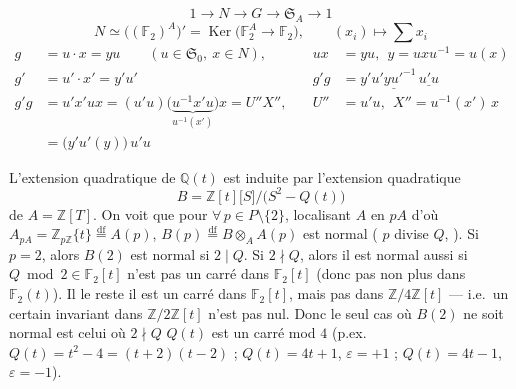 \documentclass[11pt,a4paper]{article}
\begin{document}
\[
1 \longrightarrow N \longrightarrow G \longrightarrow \mathfrak{S}_A \longrightarrow 1
\]
\[
N \simeq \bigl((\mathbb{F}_2)^A\bigr)' = \operatorname{Ker}\bigl(\mathbb{F}_2^A \to \mathbb{F}_2\bigr),
\qquad (x_i) \longmapsto \textstyle\sum x_i
\]
\[
\begin{aligned}
g &= u \cdot x = y u \qquad (u \in \mathfrak{S}_0,\ x \in N), &\quad
ux &= yu,\ \ y = u x u^{-1} = u(x) \\
g' &= u' \cdot x' = y' u' &\quad g'g &= y' \underline{u' y u'^{-1}}\, \underline{u' u} \\
g' g &= u' x' u x = (u' u)\bigl(\underbrace{u^{-1} x' u}_{u^{-1}(x')}\bigr) x = U'' X'' ,
&\quad U'' &= u'u,\ \ X'' = u^{-1}(x')\, x \\
&= \bigl(y' u'(y)\bigr)\, u' u
\end{aligned}
\]


L'extension quadratique de $\mathbb{Q}(t)$ est induite par l'extension
quadratique
\[
B = \mathbb{Z}[t]\bigl[S\bigr]/\bigl(S^2 - Q(t)\bigr)
\]
de $A = \mathbb{Z}[T]$. On voit que pour $\forall\, p \in P \setminus \{2\}$,
localisant $A$ en $pA$ d'où $A_{pA} = \mathbb{Z}_{p\mathbb{Z}}\{t\} \overset{\mathrm{df}}{=} A(p)$,
\struck{\ill{}} $B(p) \overset{\mathrm{df}}{=} B \otimes_A A(p)$ est normal (
$p$ divise $Q$, \ill{}). Si $p = 2$, alors $B(2)$ est normal si $2 \mid Q$. Si
$2 \nmid Q$, alors il est normal aussi si $Q \bmod 2 \in \mathbb{F}_2[t]$ n'est
pas un carré dans $\mathbb{F}_2[t]$ (donc pas non plus dans $\mathbb{F}_2(t)$).
 Il le reste  \ill{} il est un carré dans
$\mathbb{F}_2[t]$, mais pas dans $\mathbb{Z}/4\mathbb{Z}[t]$ --- i.e.\ un
certain invariant dans $\mathbb{Z}/2\mathbb{Z}[t]$ n'est pas nul. Donc le seul cas
où $B(2)$ ne soit normal est celui où $2 \nmid Q$ \struck{\ill{}} $Q(t)$ est un
carré mod $4$ (p.ex.\ $Q(t) = t^2 - 4 = (t+2)(t-2)$ ;
 $Q(t) = 4t + 1$, $\varepsilon = +1$ ; $Q(t) = 4t - 1$,
$\varepsilon = -1$).
\end{document}
